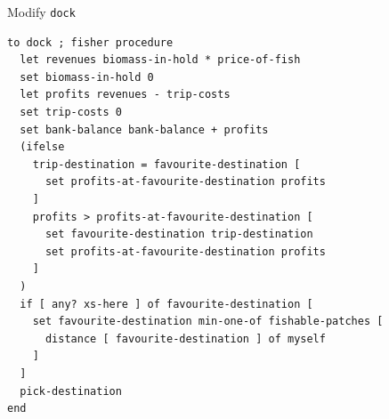 \documentclass[table, 14pt, aspectratio=169]{beamer}
\begin{document}
\begin{frame}[fragile=singleslide]{Modify \texttt{dock}}
    \scriptsize
    \begin{verbatim}
to dock ; fisher procedure
  let revenues biomass-in-hold * price-of-fish
  set biomass-in-hold 0
  let profits revenues - trip-costs
  set trip-costs 0
  set bank-balance bank-balance + profits
  (ifelse
    trip-destination = favourite-destination [
      set profits-at-favourite-destination profits
    ]
    profits > profits-at-favourite-destination [
      set favourite-destination trip-destination
      set profits-at-favourite-destination profits
    ]
  )
  if [ any? xs-here ] of favourite-destination [
    set favourite-destination min-one-of fishable-patches [ 
      distance [ favourite-destination ] of myself
    ]
  ]
  pick-destination
end
    \end{verbatim}
\end{frame}
\end{document}
